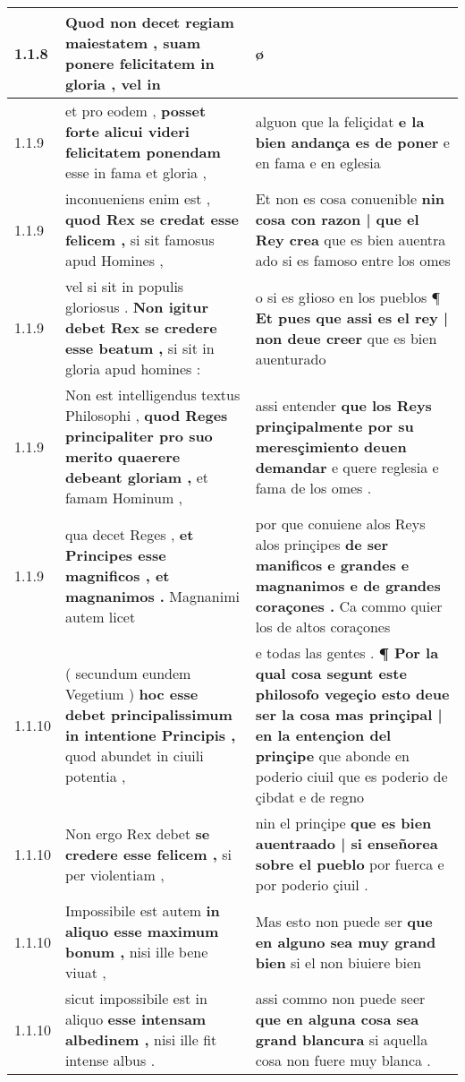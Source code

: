 \begin{tabular}{|p{1cm}|p{6.5cm}|p{6.5cm}|}
1.1.8 & Quod non decet regiam maiestatem , \textbf{ suam ponere felicitatem in gloria , } vel in & ø \\\hline
1.1.9 & et pro eodem , \textbf{ posset forte alicui videri felicitatem ponendam } esse in fama et gloria , & alguon que la feliçidat \textbf{ e la bien andança es de poner } e en fama e en eglesia \\\hline
1.1.9 & inconueniens enim est , \textbf{ quod Rex se credat esse felicem , } si sit famosus apud Homines , & Et non es cosa conuenible \textbf{ nin cosa con razon | que el Rey crea } que es bien auentra ado si es famoso entre los omes \\\hline
1.1.9 & vel si sit in populis gloriosus . \textbf{ Non igitur debet Rex se credere esse beatum , } si sit in gloria apud homines : & o si es głioso en los pueblos ¶ \textbf{ Et pues que assi es el rey | non deue creer } que es bien auenturado \\\hline
1.1.9 & Non est intelligendus textus Philosophi , \textbf{ quod Reges principaliter pro suo merito quaerere debeant gloriam , } et famam Hominum , & assi entender \textbf{ que los Reys prinçipalmente por su meresçimiento deuen demandar } e quere reglesia e fama de los omes . \\\hline
1.1.9 & qua decet Reges , \textbf{ et Principes esse magnificos , et magnanimos . } Magnanimi autem licet & por que conuiene alos Reys alos prinçipes \textbf{ de ser manificos e grandes e magnanimos e de grandes coraçones . } Ca commo quier los de altos coraçones \\\hline
1.1.10 & ( secundum eundem Vegetium ) \textbf{ hoc esse debet principalissimum in intentione Principis , } quod abundet in ciuili potentia , & e todas las gentes . \textbf{ ¶ Por la qual cosa segunt este philosofo vegeçio esto deue ser la cosa mas prinçipal | en la entençion del prinçipe } que abonde en poderio ciuil que es poderio de çibdat e de regno \\\hline
1.1.10 & Non ergo Rex debet \textbf{ se credere esse felicem , } si per violentiam , & nin el prinçipe \textbf{ que es bien auentraado | si enseñorea sobre el pueblo } por fuerca e por poderio çiuil . \\\hline
1.1.10 & Impossibile est autem \textbf{ in aliquo esse maximum bonum , } nisi ille bene viuat , & Mas esto non puede ser \textbf{ que en alguno sea muy grand bien } si el non biuiere bien \\\hline
1.1.10 & sicut impossibile est in aliquo \textbf{ esse intensam albedinem , } nisi ille fit intense albus . & assi commo non puede seer \textbf{ que en alguna cosa sea grand blancura } si aquella cosa non fuere muy blanca . \\\hline

\end{tabular}
